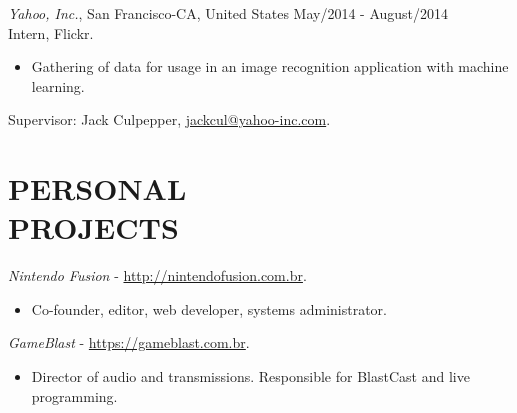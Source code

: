 \documentclass[margin]{res}
\begin{document}
\begin{resume}
			{\sl Yahoo, Inc.}, San Francisco-CA, United States \hfill May/2014 - August/2014 \\
			Intern, Flickr.
			\begin{itemize}
				\itemsep -2pt
		    	\item Gathering of data for usage in an image recognition application with machine learning.
			\end{itemize}
			Supervisor: Jack Culpepper, \href{mailto:jackcul@yahoo-inc.com}{jackcul@yahoo-inc.com}.

			
		\section{PERSONAL \\ PROJECTS}
			{\sl Nintendo Fusion} - \href{http://nintendofusion.com.br}{http://nintendofusion.com.br}.
			\begin{itemize}
				\item[] Co-founder, editor, web developer, systems administrator.
			\end{itemize}
			{\sl GameBlast} - \href{https://gameblast.com.br}{https://gameblast.com.br}.
			\begin{itemize}
				\item[] Director of audio and transmissions. Responsible for BlastCast and live programming.
			\end{itemize}


\end{resume}
\end{document}
